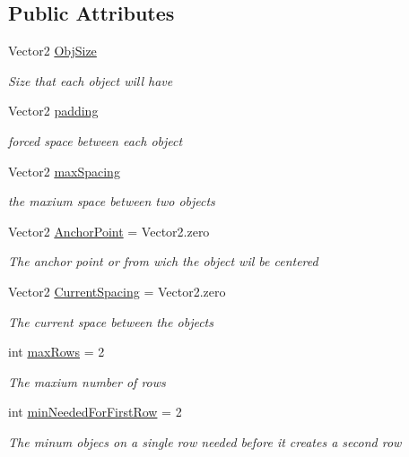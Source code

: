 \subsection*{Public Attributes}
\begin{DoxyCompactItemize}
\item 
Vector2 \hyperlink{class_custom_grid_a0cf591b7ae82c985d1983171d9391712}{Obj\+Size}
\begin{DoxyCompactList}\small\item\em Size that each object will have \end{DoxyCompactList}\item 
Vector2 \hyperlink{class_custom_grid_aa1f53f156756dfe4d9d2795fe2c52754}{padding}
\begin{DoxyCompactList}\small\item\em forced space between each object \end{DoxyCompactList}\item 
Vector2 \hyperlink{class_custom_grid_a068ef9a666cd31142751320e2a653025}{max\+Spacing}
\begin{DoxyCompactList}\small\item\em the maxium space between two objects \end{DoxyCompactList}\item 
Vector2 \hyperlink{class_custom_grid_af7596d0b65aa5ea01ae27898c523b1b5}{Anchor\+Point} = Vector2.\+zero
\begin{DoxyCompactList}\small\item\em The anchor point or from wich the object wil be centered \end{DoxyCompactList}\item 
Vector2 \hyperlink{class_custom_grid_ab9594c84442d7bd9f8cad31cd2d75c84}{Current\+Spacing} = Vector2.\+zero
\begin{DoxyCompactList}\small\item\em The current space between the objects \end{DoxyCompactList}\item 
int \hyperlink{class_custom_grid_a74432277987a0e6cc02d0db891ec77ba}{max\+Rows} = 2
\begin{DoxyCompactList}\small\item\em The maxium number of rows \end{DoxyCompactList}\item 
int \hyperlink{class_custom_grid_a985fc1fc02418d3286ffbd41c98417a5}{min\+Needed\+For\+First\+Row} = 2
\begin{DoxyCompactList}\small\item\em The minum objecs on a single row needed before it creates a second row \end{DoxyCompactList}\item 

\end{DoxyCompactItemize}
